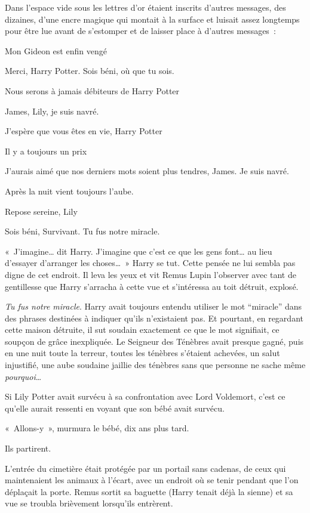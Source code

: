 Dans l'espace vide sous les lettres d'or étaient inscrits d'autres messages, des dizaines, d'une encre magique qui montait à la surface et luisait assez longtemps pour être lue avant de s'estomper et de laisser place à d'autres messages~:
\begin{center}

Mon Gideon est enfin vengé

Merci, Harry Potter.
Sois béni, où que tu sois.

Nous serons à jamais débiteurs de Harry Potter

James, Lily, je suis navré.

J'espère que vous êtes en vie, Harry Potter

Il y a toujours un prix

J'aurais aimé que nos derniers mots soient plus tendres, James.
Je suis navré.

Après la nuit vient toujours l'aube.

Repose sereine, Lily

Sois béni, Survivant.
Tu fus notre miracle.
\end{center}

«~J'imagine… dit Harry.
J'imagine que c'est ce que les gens font… au lieu d'essayer d'arranger les choses…~»
Harry se tut.
Cette pensée ne lui sembla pas digne de cet endroit.
Il leva les yeux et vit Remus Lupin l'observer avec tant de gentillesse que Harry s'arracha à cette vue et s'intéressa au toit détruit, explosé.

\emph{Tu fus notre miracle}.
Harry avait toujours entendu utiliser le mot “miracle” dans des phrases destinées à indiquer qu'ils n'existaient pas.
Et pourtant, en regardant cette maison détruite, il sut soudain exactement ce que le mot signifiait, ce soupçon de grâce inexpliquée.
Le Seigneur des Ténèbres avait presque gagné, puis en une nuit toute la terreur, toutes les ténèbres s'étaient achevées, un salut injustifié, une aube soudaine jaillie des ténèbres sans que personne ne sache même \emph{pourquoi}…

Si Lily Potter avait survécu à sa confrontation avec Lord Voldemort, c'est ce qu'elle aurait ressenti en voyant que son bébé avait survécu.

«~Allons-y~», murmura le bébé, dix ans plus tard.

Ils partirent.

L'entrée du cimetière était protégée par un portail sans cadenas, de ceux qui maintenaient les animaux à l'écart, avec un endroit où se tenir pendant que l'on déplaçait la porte.
Remus sortit sa baguette (Harry tenait déjà la sienne) et sa vue se troubla brièvement lorsqu'ils entrèrent.

